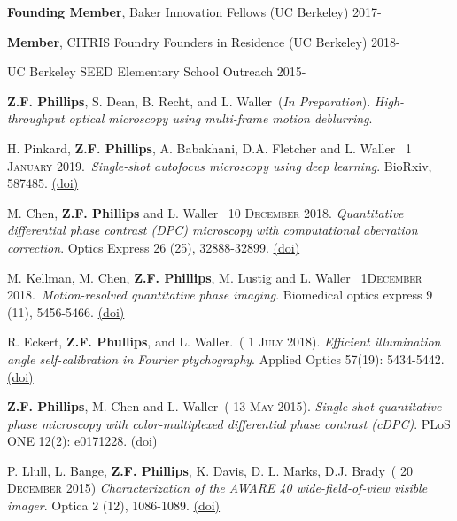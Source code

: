 \documentclass[12pt,letterpaper]{article}
\newcommand{\mhead}[1]{\leavevmode\marginpar{\sffamily\footnotesize #1}}
\newcommand{\rdate}[1]{{} \hfill #1}
\renewcommand{\date}[1]{{} #1}
\begin{document}
\textbf{Founding Member}, Baker Innovation Fellows (UC Berkeley) \rdate{2017-}

\textbf{Member}, CITRIS Foundry Founders in Residence (UC Berkeley) \rdate{2018-}

\medskip
\mhead{Volunteering}%
UC Berkeley SEED Elementary School Outreach \rdate{2015-}

\newpage
\mhead{Publications}%
\par\vspace{-\baselineskip}

\textbf{Z.F. Phillips}, S. Dean, B. Recht, and L. Waller~(\textit{In Preparation}).
\emph{High-throughput optical microscopy using multi-frame motion deblurring}.

\medskip
H. Pinkard, \textbf{Z.F. Phillips}, A. Babakhani, D.A. Fletcher and L. Waller~\date{1 \textsc{January} 2019}.~\emph{Single-shot autofocus microscopy using deep learning}. BioRxiv, 587485. \href{https://doi.org/10.1101/587485}{(doi)}

\medskip
M. Chen, \textbf{Z.F. Phillips} and L. Waller~\date{10 \textsc{December} 2018}. \emph{Quantitative differential phase contrast (DPC) microscopy with computational aberration correction}. Optics Express 26 (25), 32888-32899. \href{https://doi.org/10.1364/OE.26.032888}{(doi)}

\medskip
M. Kellman, M. Chen, \textbf{Z.F. Phillips}, M. Lustig and L. Waller~\date{1\textsc{December} 2018}.~\emph{Motion-resolved quantitative phase imaging}. Biomedical optics express 9 (11), 5456-5466. \href{https://doi.org/10.1364/BOE.9.005456}{(doi)}

\medskip
R. Eckert, \textbf{Z.F. Phullips}, and L. Waller.~(\date{1 \textsc{July} 2018}).
\emph{Efficient illumination angle self-calibration in Fourier ptychography}.
Applied Optics 57(19): 5434-5442. \href{https://doi.org/10.1364/AO.57.005434}{(doi)}

\medskip
\textbf{Z.F. Phillips}, M. Chen and L. Waller~(\date{13 \textsc{May} 2015}).
\emph{Single-shot quantitative phase microscopy with color-multiplexed differential phase contrast (cDPC)}.
PLoS ONE 12(2): e0171228. \href{http://journals.plos.org/plosone/article?id=10.1371/journal.pone.0171228}{(doi)}

\medskip
P. Llull, L. Bange, \textbf{Z.F. Phillips}, K. Davis, D. L. Marks, D.J. Brady~(\date{20 \textsc{December} 2015}) \emph{Characterization of the AWARE 40 wide-field-of-view visible imager}. Optica 2 (12), 1086-1089. \href{https://doi.org/10.1364/OPTICA.2.001086}{(doi)}
\end{document}

